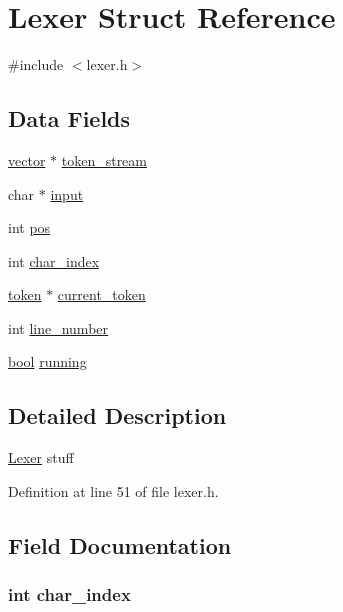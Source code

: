\hypertarget{struct_lexer}{\section{Lexer Struct Reference}
\label{struct_lexer}
}


{\ttfamily \#include $<$lexer.\+h$>$}

\subsection*{Data Fields}
\begin{DoxyCompactItemize}
\item 
\hyperlink{structvector}{vector} $\ast$ \hyperlink{struct_lexer_a3b32179d2f774c0424b580ead35a17f8}{token\+\_\+stream}
\item 
char $\ast$ \hyperlink{struct_lexer_ab7a32d1060db5fb76b1bd8aa2abced98}{input}
\item 
int \hyperlink{struct_lexer_a1910d262855b71da353ed0d07a6c7823}{pos}
\item 
int \hyperlink{struct_lexer_a8d867d64f533c755062f04fba4e67557}{char\+\_\+index}
\item 
\hyperlink{structtoken}{token} $\ast$ \hyperlink{struct_lexer_ae75af41040d594c11005ff159d8b5fbc}{current\+\_\+token}
\item 
int \hyperlink{struct_lexer_ada7b81cc6d5bbe25b92c0162697e0f58}{line\+\_\+number}
\item 
\hyperlink{util_8h_af6a258d8f3ee5206d682d799316314b1}{bool} \hyperlink{struct_lexer_a36f7b6be7108281af77939ceaec42fd6}{running}
\end{DoxyCompactItemize}


\subsection{Detailed Description}
\hyperlink{struct_lexer}{Lexer} stuff 

Definition at line 51 of file lexer.\+h.



\subsection{Field Documentation}
\hypertarget{struct_lexer_a8d867d64f533c755062f04fba4e67557}{
\subsubsection[{char\+\_\+index}]{\setlength{\rightskip}{0pt plus 5cm}int char\+\_\+index}}\label{struct_lexer_a8d867d64f533c755062f04fba4e67557}


